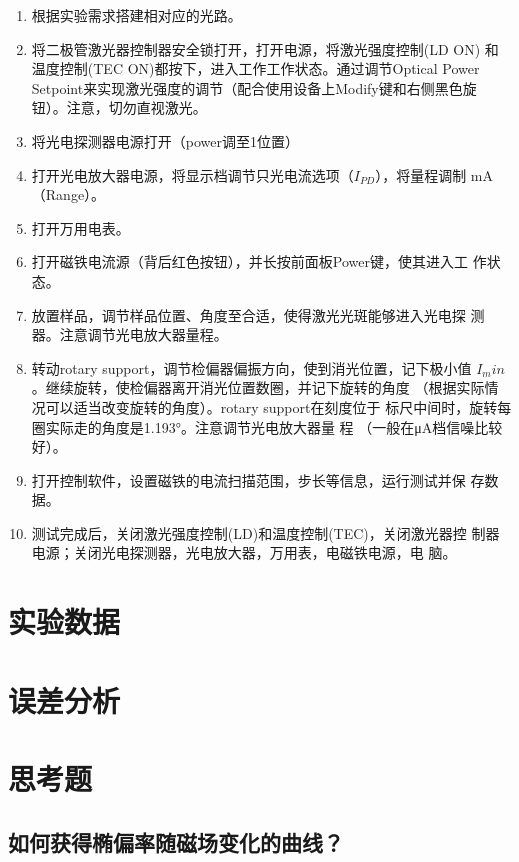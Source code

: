 \documentclass[a4paper]{article}
\begin{document}
\begin{enumerate}
    \item 根据实验需求搭建相对应的光路。
    \item 将二极管激光器控制器安全锁打开，打开电源，将激光强度控制(LD ON)
    和温度控制(TEC ON)都按下，进入工作工作状态。通过调节Optical Power 
    Setpoint来实现激光强度的调节（配合使用设备上Modify键和右侧黑色旋
    钮）。注意，切勿直视激光。
    \item 将光电探测器电源打开（power调至1位置）
    \item 打开光电放大器电源，将显示档调节只光电流选项（$I_{PD}$），将量程调制
    mA（Range）。
    \item 打开万用电表。
    \item 打开磁铁电流源（背后红色按钮），并长按前面板Power键，使其进入工
    作状态。
    \item 放置样品，调节样品位置、角度至合适，使得激光光斑能够进入光电探
    测器。注意调节光电放大器量程。
    \item 转动rotary support，调节检偏器偏振方向，使到消光位置，记下极小值
    $I_min$ 。继续旋转，使检偏器离开消光位置数圈，并记下旋转的角度
    （根据实际情况可以适当改变旋转的角度）。rotary support在刻度位于
    标尺中间时，旋转每圈实际走的角度是1.193°。注意调节光电放大器量
    程 （一般在μA档信噪比较好）。  
    \item 打开控制软件，设置磁铁的电流扫描范围，步长等信息，运行测试并保
    存数据。
    \item 测试完成后，关闭激光强度控制(LD)和温度控制(TEC)，关闭激光器控
    制器电源；关闭光电探测器，光电放大器，万用表，电磁铁电源，电
    脑。    
\end{enumerate}
\section{实验数据}

\section{误差分析}


\section{思考题}
\subsection*{如何获得椭偏率随磁场变化的曲线？}


\nocite{jiaocai}

\end{document}
